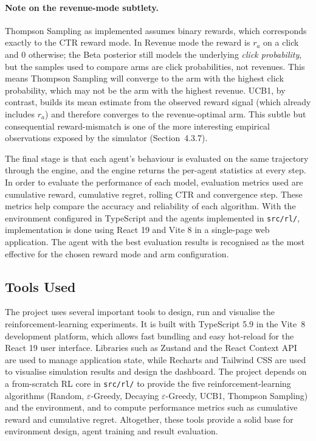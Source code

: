 \begin{itemize}
\paragraph{Note on the revenue-mode subtlety.}
Thompson Sampling as implemented assumes binary rewards, which corresponds exactly to the CTR reward mode. In Revenue mode the reward is $r_a$ on a click and $0$ otherwise; the Beta posterior still models the underlying \emph{click probability}, but the samples used to compare arms are click probabilities, not revenues. This means Thompson Sampling will converge to the arm with the highest click probability, which may not be the arm with the highest revenue. UCB1, by contrast, builds its mean estimate from the observed reward signal (which already includes $r_a$) and therefore converges to the revenue-optimal arm. This subtle but consequential reward-mismatch is one of the more interesting empirical observations exposed by the simulator (Section~4.3.7).
\end{itemize}

The final stage is that each agent's behaviour is evaluated on the same trajectory through the engine, and the engine returns the per-agent statistics at every step. In order to evaluate the performance of each model, evaluation metrics used are cumulative reward, cumulative regret, rolling CTR and convergence step. These metrics help compare the accuracy and reliability of each algorithm. With the environment configured in TypeScript and the agents implemented in \texttt{src/rl/}, implementation is done using React 19 and Vite 8 in a single-page web application. The agent with the best evaluation results is recognised as the most effective for the chosen reward mode and arm configuration.

\subsection{Tools Used}
The project uses several important tools to design, run and visualise the reinforcement-learning experiments. It is built with TypeScript 5.9 in the Vite~8 development platform, which allows fast bundling and easy hot-reload for the React 19 user interface. Libraries such as Zustand and the React Context API are used to manage application state, while Recharts and Tailwind CSS are used to visualise simulation results and design the dashboard. The project depends on a from-scratch RL core in \texttt{src/rl/} to provide the five reinforcement-learning algorithms (Random, $\varepsilon$-Greedy, Decaying $\varepsilon$-Greedy, UCB1, Thompson Sampling) and the environment, and to compute performance metrics such as cumulative reward and cumulative regret. Altogether, these tools provide a solid base for environment design, agent training and result evaluation.

